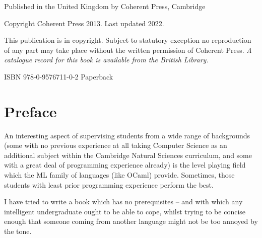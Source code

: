 \documentclass[]{book}
\newcommand{\smspace}{\vspace{4mm}}
\begin{document}
\cleardoublepage %

\thispagestyle{empty}

\vphantom{a}%

\vspace{50mm}

\noindent Published in the United Kingdom by Coherent Press, Cambridge

\vspace{3mm}

\noindent Copyright Coherent Press 2013. Last updated 2022.

\vspace{3mm}

\noindent This publication is in copyright. Subject to statutory exception no reproduction of any part may take place without the written permission of Coherent Press. \textit{A catalogue record for this book is available from the British Library.}

\smspace

\noindent ISBN 978-0-9576711-0-2 Paperback\\



\chapter*{Preface}

An interesting aspect of supervising students from a wide range of backgrounds (some with no previous experience at all taking Computer Science as an additional subject within the Cambridge Natural Sciences curriculum, and some with a great deal of programming experience already) is the level playing field which the ML family of languages (like OCaml) provide. Sometimes, those students with least prior programming experience perform the best.

I have tried to write a book which has no prerequisites -- and with which any intelligent undergraduate ought to be able to cope, whilst trying to be concise enough that someone coming from another language might not be too annoyed by the tone.
\end{document}
